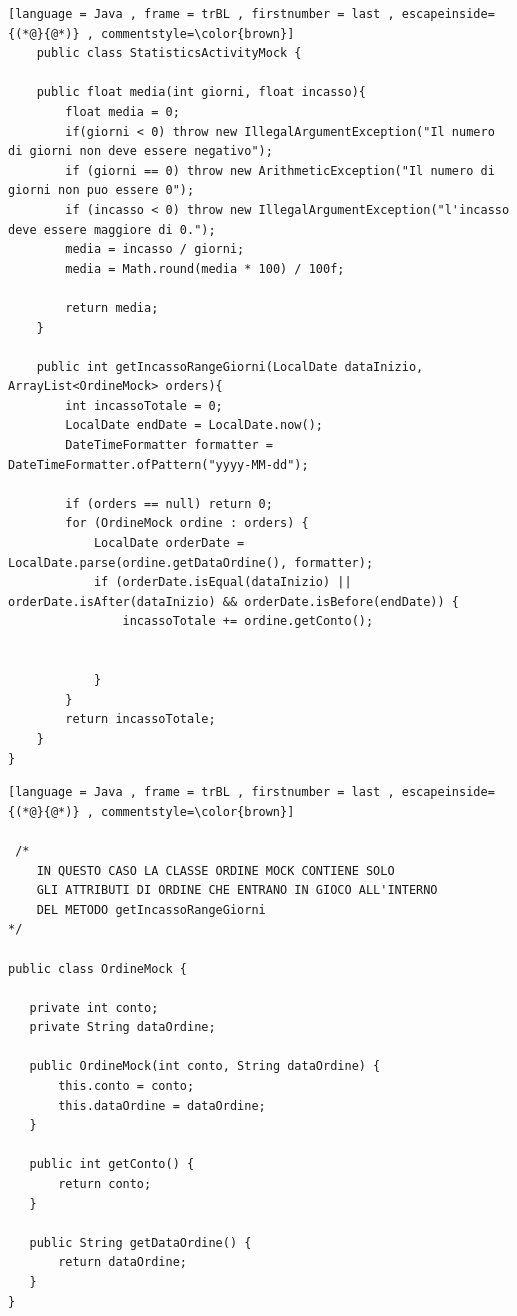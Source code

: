 \begin{lstlisting}[language = Java , frame = trBL , firstnumber = last , escapeinside={(*@}{@*)} , commentstyle=\color{brown}]
    public class StatisticsActivityMock {

    public float media(int giorni, float incasso){
        float media = 0;
        if(giorni < 0) throw new IllegalArgumentException("Il numero di giorni non deve essere negativo");
        if (giorni == 0) throw new ArithmeticException("Il numero di giorni non puo essere 0");
        if (incasso < 0) throw new IllegalArgumentException("l'incasso deve essere maggiore di 0.");
        media = incasso / giorni;
        media = Math.round(media * 100) / 100f;

        return media;
    }

    public int getIncassoRangeGiorni(LocalDate dataInizio, ArrayList<OrdineMock> orders){
        int incassoTotale = 0;
        LocalDate endDate = LocalDate.now();
        DateTimeFormatter formatter = DateTimeFormatter.ofPattern("yyyy-MM-dd");

        if (orders == null) return 0;
        for (OrdineMock ordine : orders) {
            LocalDate orderDate = LocalDate.parse(ordine.getDataOrdine(), formatter);
            if (orderDate.isEqual(dataInizio) || orderDate.isAfter(dataInizio) && orderDate.isBefore(endDate)) {
                incassoTotale += ordine.getConto();


            }
        }
        return incassoTotale;
    }
}
\end{lstlisting}
\vspace{0.2cm}

\begin{lstlisting}[language = Java , frame = trBL , firstnumber = last , escapeinside={(*@}{@*)} , commentstyle=\color{brown}]
   
 /*
    IN QUESTO CASO LA CLASSE ORDINE MOCK CONTIENE SOLO
    GLI ATTRIBUTI DI ORDINE CHE ENTRANO IN GIOCO ALL'INTERNO
    DEL METODO getIncassoRangeGiorni
*/

public class OrdineMock {

   private int conto;
   private String dataOrdine;

   public OrdineMock(int conto, String dataOrdine) {
       this.conto = conto;
       this.dataOrdine = dataOrdine;
   }

   public int getConto() {
       return conto;
   }

   public String getDataOrdine() {
       return dataOrdine;
   }
}

\end{lstlisting}
\vspace{0.2cm}
    
